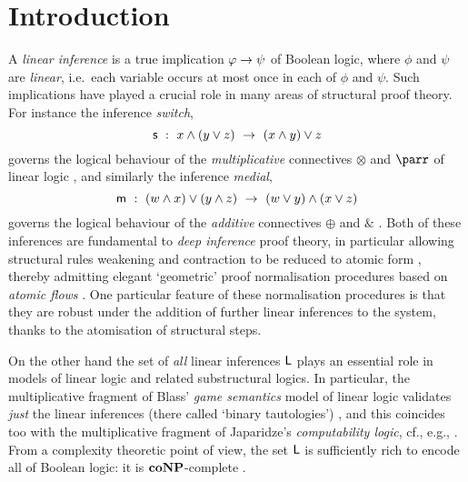 \documentclass[a4paper, UKenglish, cleveref]{lipics-v2019}
\begin{document}
\section{Introduction}
\label{sec:introduction}
A \emph{linear inference} is a true implication $\varphi \rightarrow \psi$ of Boolean logic, where $\phi$ and $\psi$ are \emph{linear}, i.e.\ each variable occurs at most once in each of $\phi$ and $\psi$.
Such implications have played a crucial role in many areas of structural proof theory.
For instance the inference \emph{switch},
\[
\mathsf{s} \ : \
x \land (y \lor z)
\ \rightarrow \
(x \land y) \lor z
\]
governs the logical behaviour of the \emph{multiplicative} connectives $\otimes$ and $\parr$ of linear logic \cite{Gir87:linear-logic},
and similarly the inference \emph{medial},
\[
\mathsf{m} \ : \
(w \land x) \lor (y \land z)
\ \rightarrow \
(w \lor y) \land (x \lor z)
\]
governs the logical behaviour of the \emph{additive} connectives $\oplus$ and $\&$ \cite{Str02:lin-log-loc-sys,Str03:phd-thesis}.
Both of these inferences are fundamental to \emph{deep inference} proof theory, in particular allowing structural rules weakening and contraction to be reduced to atomic form \cite{BruTiu01:class-log-loc-sys,Bru03:phd-thesis}, thereby admitting elegant `geometric' proof normalisation procedures based on \emph{atomic flows} \cite{GugGun08:norm-contr-di-at-fl,Gun09:phd-thesis}.
One particular feature of these normalisation procedures is that they are robust under the addition of further linear inferences to the system, thanks to the atomisation of structural steps.

On the other hand the set of \emph{all} linear inferences $\mathsf L$ plays an essential role in {models} of linear logic and related substructural logics.
In particular, the multiplicative fragment of Blass' \emph{game semantics} model of linear logic validates \emph{just} the linear inferences (there called `binary tautologies') \cite{Bla92:game-semantics-ll}, and this coincides too with the multiplicative fragment of Japaridze's \emph{computability logic}, cf., e.g., \cite{Jap05:intro-to-cirquent-calc}.
From a complexity theoretic point of view, the set $\mathsf L$ is sufficiently rich to encode all of Boolean logic: it is $\mathbf{co}\mathbf{NP}$-complete \cite{Str12:ext-wo-cut,DasStr16:no-compl-lin-sys}.
\end{document}
